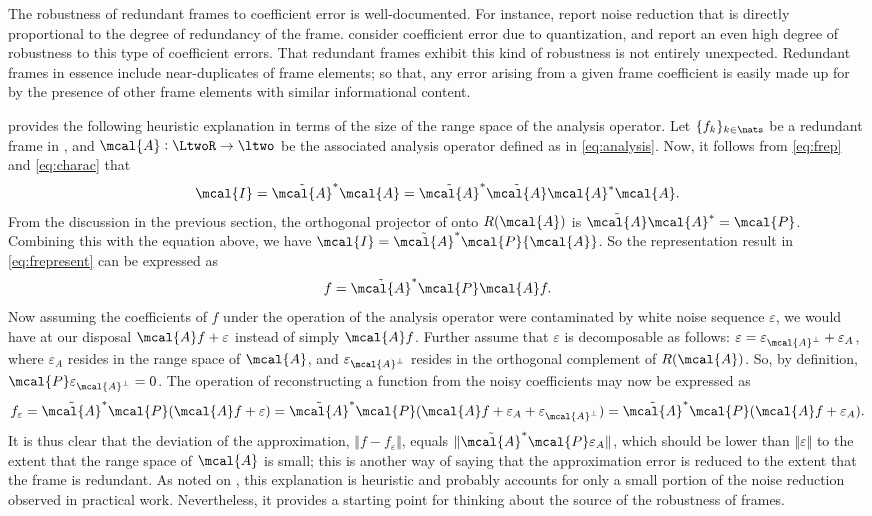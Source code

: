 \documentclass[a4paper, 12pt]{article}
\newcommand{\ap}{\ensuremath{\mcal{A}}\xspace}
\begin{document}
The robustness of redundant frames to coefficient error is well-documented. For instance, \cite{Munch1992} report noise reduction that is directly proportional to the degree of redundancy of the frame. \cite{Cvetkovic1998} consider coefficient error due to quantization, and report an even high degree of robustness to this type of coefficient errors. That redundant frames exhibit this kind of robustness is not entirely unexpected. Redundant frames in essence include near-duplicates of frame elements; so that, any error arising from a given frame coefficient is easily made up for by the presence of other frame elements with similar informational content. 


\cite{Daubechies1992} provides the following heuristic explanation in terms of the size of the range space of the analysis operator. Let $\{f_k\}_{k \in \nats}$ be a redundant  frame in \LtwoR, and $\mcal{A} : \LtwoR \to \ltwo$ be the associated analysis operator defined as in \eqref{eq:analysis}.  Now, it follows from   \eqref{eq:frep} and \eqref{eq:charac} that   
\begin{align}
  \mcal{I} = \tilde{\ap}^*\ap  = \tilde{\ap}^*\tilde{\ap}\ap^*\ap. \notag
  \label{}
\end{align}
From the discussion in the previous section,   the orthogonal projector of \ltwo onto $R(\mcal{A})$  is  $\tilde{\mcal{A}}\mcal{A}^* = \mcal{P}$. Combining this with the equation above, we have $\mcal{I} =  \tilde{\mcal{A}}^* \mcal{P} {\mcal{A}}$. So the representation result in \eqref{eq:frepresent} can be expressed as 
\begin{align}
  f = \tilde{\ap}^* \mcal{P} \ap f.\notag
  \label{}
\end{align}
Now assuming the coefficients of $f$ under the operation of the analysis operator were contaminated by white noise sequence $\varepsilon$, we would have at our disposal ${\ap}f + \varepsilon$ instead of simply ${\ap} f$. Further assume that $\varepsilon$ is decomposable as  follows:  $\varepsilon = \varepsilon_{\mcal{A}^\perp}+ \varepsilon_A$, where $\varepsilon_A$ resides in the range space of \ap, and  $\varepsilon_{\mcal{A}^\perp}$ resides in the orthogonal complement  of $R(\ap)$. So, by definition, $\mcal{P} \varepsilon_{\mcal{A}^\perp} = 0$.  The operation of reconstructing a function from the noisy coefficients may now be expressed as 
\begin{align}
  f_\varepsilon = \tilde{\mcal{A}}^*\mcal{P}({\mcal{A}}f + \varepsilon) = \tilde{\mcal{A}}^*\mcal{P}({\mcal{A}}f + \varepsilon_A + \varepsilon_{\mcal{A}^\perp}) = \tilde{\mcal{A}}^*\mcal{P}({\mcal{A}}f + \varepsilon_A ). \notag
  \label{}
\end{align}
It is thus clear  that the deviation of the approximation, $\Vert f - f_\varepsilon \Vert$, equals  $\Vert\tilde{\ap}^*\mcal{P}\varepsilon_A \Vert$, which  should be lower than $\Vert \varepsilon \Vert$ to the extent that the range space of $\mcal{A}$ is small; this is another way of saying that the approximation error is reduced to the extent that the frame is redundant. As noted on \cite[][pp. 98]{Daubechies1992}, this explanation is heuristic and probably accounts for only a small portion of the noise reduction  observed in practical work. Nevertheless,  it provides a starting point for thinking about the source of the robustness of frames. 
\end{document}
